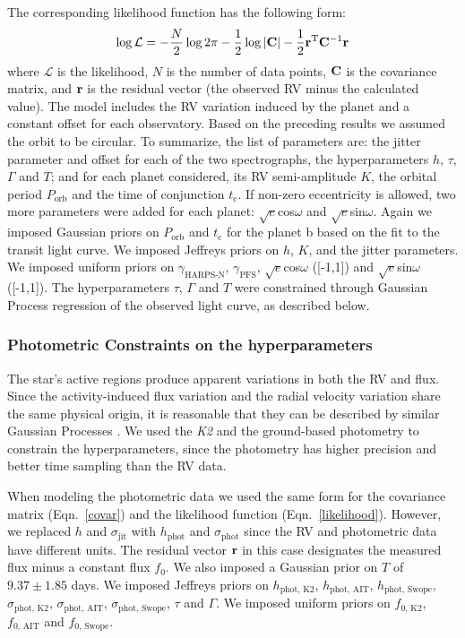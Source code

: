 \documentclass[twocolumn]{aastex61}
\begin{document}
The corresponding likelihood function has the following form:
\begin{equation}
\label{likelihood}
\log{\mathcal{L}} =  -\frac{N}{2}\log{2\pi}-\frac{1}{2}\log{|\bf{C}|}-\frac{1}{2}\bf{r}^{\text{T}}\bf{C} ^{-\text{1}} \bf{r}
\end{equation}
where $\mathcal{L}$ is the likelihood, $N$ is the number of data points, $\bf{C}$ is the covariance matrix, and $\bf{r}$ is the residual vector (the observed RV minus the calculated value). The model includes the RV variation induced by the planet and a constant offset for each observatory.
Based on the preceding results we assumed the orbit to be circular.
To summarize, the list of parameters are: the jitter parameter and offset for each of the two spectrographs, the hyperparameters $h$, $\tau$, $\Gamma$ and $T$; and for each planet considered, its RV semi-amplitude $K$, the orbital period $P_{\text{orb}}$ and the time of conjunction $t_{\text{c}}$. If non-zero eccentricity is allowed, two more parameters were added for each planet: $\sqrt{e}$cos$\omega$ and $\sqrt{e}$sin$\omega$. Again we imposed Gaussian priors on $P_{\text{orb}}$ and $t_{\text{c}}$ for the planet b based on the fit to the transit light curve. We imposed Jeffreys priors on $h$, $K$, and the
jitter parameters. We imposed uniform priors on $\gamma_{\text{HARPS-N}}$, $\gamma_{\text{PFS}}$, $\sqrt{e}$cos$\omega$ ([-1,1]) and $\sqrt{e}$sin$\omega$ ([-1,1]). The hyperparameters $\tau$, $\Gamma$ and $T$ were constrained through Gaussian Process regression of the observed light curve, as described below.

\subsubsection{Photometric Constraints on the hyperparameters}

The star's active regions produce apparent variations in both the RV and flux. Since the activity-induced flux variation and the radial velocity variation share the same physical origin, it is reasonable that they can be described by similar Gaussian Processes \citep{Aigrain2012}. We used the {\it K2} and the ground-based photometry to constrain the hyperparameters, since the photometry has higher precision and better time sampling than the RV data.

When modeling the photometric data we used the same form for the covariance matrix (Eqn.~\ref{covar}) and the likelihood function (Eqn.~\ref{likelihood}). However, we replaced $h$ and $\sigma_{\text{jit}}$ with $h_{\text{phot}}$ and $\sigma_{\text{phot}}$ since the RV and photometric data have different units.
The residual vector $\bf{r}$ in this case designates the measured flux minus a constant flux $f_0$.
We also imposed a Gaussian prior on $T$ of $9.37 \pm 1.85$ days. We imposed Jeffreys priors on
$h_{\text{phot, K2}}$, $h_{\text{phot, AIT}}$,  $h_{\text{phot, Swope}}$, $\sigma_{\text{phot, K2}}$, $\sigma_{\text{phot, AIT}}$, $\sigma_{\text{phot, Swope}}$, $\tau$ and  $\Gamma$. We imposed uniform priors on $f_{\text{0, K2}}$, $f_{\text{0, AIT}}$ and $f_{\text{0, Swope}}$.
\end{document}
